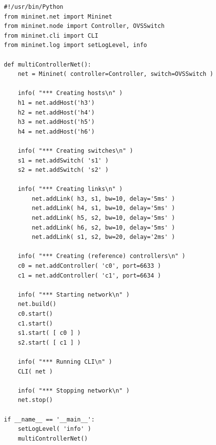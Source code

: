 \begin{minipage}{\linewidth}
\begin{lstlisting}[label=lst:activity-1-script, caption=complete Python script required for Activity 1]
#!/usr/bin/Python
from mininet.net import Mininet
from mininet.node import Controller, OVSSwitch
from mininet.cli import CLI
from mininet.log import setLogLevel, info

def multiControllerNet():
    net = Mininet( controller=Controller, switch=OVSSwitch )

    info( "*** Creating hosts\n" )
    h1 = net.addHost('h3')
    h2 = net.addHost('h4')
    h3 = net.addHost('h5')
    h4 = net.addHost('h6')

    info( "*** Creating switches\n" )
    s1 = net.addSwitch( 's1' )
    s2 = net.addSwitch( 's2' )

    info( "*** Creating links\n" )
		net.addLink( h3, s1, bw=10, delay='5ms' )
		net.addLink( h4, s1, bw=10, delay='5ms' )
		net.addLink( h5, s2, bw=10, delay='5ms' )
		net.addLink( h6, s2, bw=10, delay='5ms' )
		net.addLink( s1, s2, bw=20, delay='2ms' )

    info( "*** Creating (reference) controllers\n" )
    c0 = net.addController( 'c0', port=6633 )
    c1 = net.addController( 'c1', port=6634 )

    info( "*** Starting network\n" )
    net.build()
    c0.start()
    c1.start()
    s1.start( [ c0 ] )
    s2.start( [ c1 ] )

    info( "*** Running CLI\n" )
    CLI( net )

    info( "*** Stopping network\n" )
    net.stop()

if __name__ == '__main__':
    setLogLevel( 'info' )
    multiControllerNet()
\end{lstlisting}
\end{minipage}
